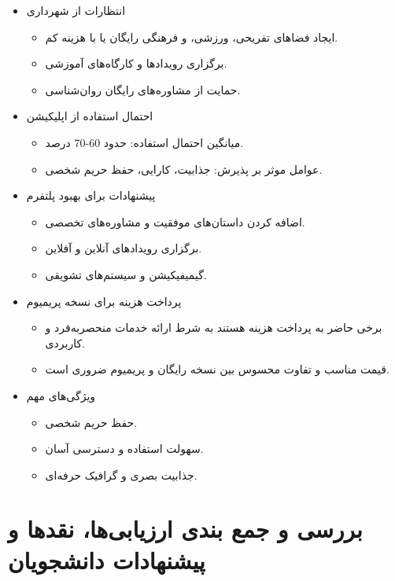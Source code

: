 \documentclass[dvipsnames, svgnames, x11names, 11pt]{article}
\begin{document}
\begin{itemize}
\item 
انتظارات از شهرداری
\begin{itemize}
\item 
ایجاد فضاهای تفریحی، ورزشی، و فرهنگی رایگان یا با هزینه کم.
\item 
برگزاری رویدادها و کارگاه‌های آموزشی.
\item 
حمایت از مشاوره‌های رایگان روان‌شناسی.
\end{itemize}

\item 
احتمال استفاده از اپلیکیشن
\begin{itemize}
\item 
میانگین احتمال استفاده: حدود 60-70 درصد.
\item 
عوامل موثر بر پذیرش: جذابیت، کارایی، حفظ حریم شخصی.
\end{itemize}

\item 
پیشنهادات برای بهبود پلتفرم

\begin{itemize}
\item 
اضافه کردن داستان‌های موفقیت و مشاوره‌های تخصصی.
\item 
برگزاری رویدادهای آنلاین و آفلاین.
\item 
گیمیفیکیشن و سیستم‌های تشویقی.
\end{itemize}

\item 
پرداخت هزینه برای نسخه پریمیوم

\begin{itemize}
\item 
برخی حاضر به پرداخت هزینه هستند به شرط ارائه خدمات منحصربه‌فرد و کاربردی.
\item 
قیمت مناسب و تفاوت محسوس بین نسخه رایگان و پریمیوم ضروری است.
\end{itemize}

\item 
ویژگی‌های مهم

\begin{itemize}
\item 
حفظ حریم شخصی.
\item 
سهولت استفاده و دسترسی آسان.
\item 
جذابیت بصری و گرافیک حرفه‌ای.
\end{itemize}
\end{itemize}

\section{بررسی و جمع بندی ارزیابی‌ها، نقدها و پیشنهادات دانشجویان}
\end{document}
